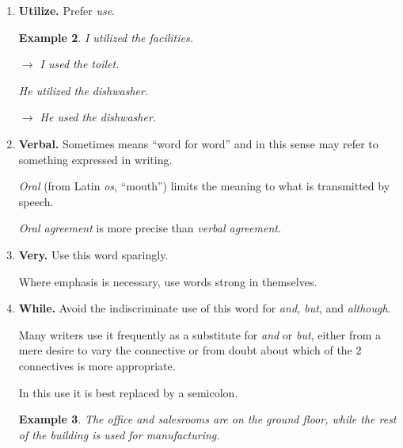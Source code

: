 \documentclass{book}
\numberwithin{equation}{section}
\newtheorem{example}{Example}[chapter]
\begin{document}
\begin{enumerate}
\begin{example}
        Of all the spiders, the one that lives in a bubble under water is the most unique.
        
        $\to$ Among spiders, the one that lives in a bubble under water is unique.
    \end{example}
    \item \textbf{Utilize.} Prefer \textit{use}.
    \begin{example}
        I utilized the facilities.
        
        $\to$ I used the toilet.
        
        He utilized the dishwasher.
        
        $\to$ He used the dishwasher.
    \end{example}
    \item \textbf{Verbal.} Sometimes means ``word for word'' and in this sense may refer to something expressed in writing.
    
    \textit{Oral} (from Latin \textit{os}, ``mouth'') limits the meaning to what is transmitted by speech.
    
    \textit{Oral agreement} is more precise than \textit{verbal agreement}.
    \item \textbf{Very.} Use this word sparingly.
    
    Where emphasis is necessary, use words strong in themselves.
    \item \textbf{While.} Avoid the indiscriminate use of this word for \textit{and, but}, and \textit{although}.
    
    Many writers use it frequently as a substitute for \textit{and} or \textit{but}, either from a mere desire to vary the connective or from doubt about which of the 2 connectives is more appropriate.
    
    In this use it is best replaced by a semicolon.
    \begin{example}
        The office and salesrooms are on the ground floor, while the rest of the building is used for manufacturing.
        

\end{example}
\end{enumerate}
\end{document}
